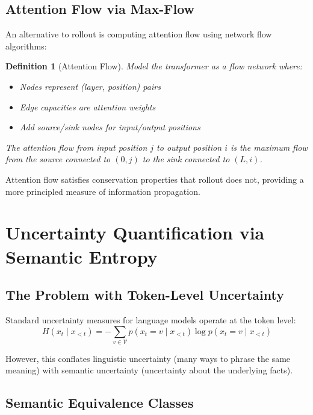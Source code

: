 \documentclass[11pt]{article}
\newtheorem{definition}[theorem]{Definition}
\newcommand{\V}{\mathcal{V}}
\begin{document}
\subsection{Attention Flow via Max-Flow}

An alternative to rollout is computing attention flow using network flow algorithms:

\begin{definition}[Attention Flow]
Model the transformer as a flow network where:
\begin{itemize}
    \item Nodes represent (layer, position) pairs
    \item Edge capacities are attention weights
    \item Add source/sink nodes for input/output positions
\end{itemize}
The attention flow from input position $j$ to output position $i$ is the maximum flow from the source connected to $(0, j)$ to the sink connected to $(L, i)$.
\end{definition}

Attention flow satisfies conservation properties that rollout does not, providing a more principled measure of information propagation.

\section{Uncertainty Quantification via Semantic Entropy}

\subsection{The Problem with Token-Level Uncertainty}

Standard uncertainty measures for language models operate at the token level:
\begin{equation}
H(x_t \mid x_{<t}) = -\sum_{v \in \V} p(x_t = v \mid x_{<t}) \log p(x_t = v \mid x_{<t})
\end{equation}

However, this conflates linguistic uncertainty (many ways to phrase the same meaning) with semantic uncertainty (uncertainty about the underlying facts).

\subsection{Semantic Equivalence Classes}
\end{document}
